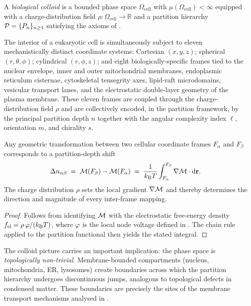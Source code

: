 \begin{definition}
\label{def:colloid}
A \emph{biological colloid} is a bounded phase space
$\Omega_\mathrm{cell}$ with $\mu(\Omega_\mathrm{cell}) < \infty$
equipped with a charge-distribution field
$\rho:\Omega_\mathrm{cell}\to\mathbb{R}$ and a partition hierarchy
$\mathcal{P} = \{P_n\}_{n\ge 1}$ satisfying the axioms of
.
\end{definition}

The interior of a eukaryotic cell is simultaneously subject to eleven
mechanistically distinct coordinate systems: Cartesian $(x,y,z)$; spherical
$(r,\theta,\phi)$; cylindrical $(r,\phi,z)$; and eight
biologically-specific frames tied to the nuclear envelope, inner and outer
mitochondrial membranes, endoplasmic reticulum cisternae, cytoskeletal tensegrity
axes, lipid-raft microdomains, vesicular transport lanes, and the electrostatic
double-layer geometry of the plasma membrane.  These eleven frames are coupled
through the charge-distribution field $\rho$ and are collectively encoded, in
the partition framework, by the principal partition depth $n$ together with the
angular complexity index $\ell$, orientation $m$, and chirality $s$.

\begin{proposition}
\label{prop:frame-coupling}
Any geometric transformation between two cellular coordinate frames $F_\alpha$
and $F_\beta$ corresponds to a partition-depth shift
\[
    \Delta n_{\alpha\beta}
    \;=\;
    \mathcal{M}(F_\beta) - \mathcal{M}(F_\alpha)
    \;=\;
    \frac{1}{k_{\mathrm{B}} T}\int_{F_\alpha}^{F_\beta} \nabla\mathcal{M} \cdot \mathrm{d}\mathbf{r}.
\]
The charge distribution $\rho$ sets the local gradient $\nabla\mathcal{M}$ and
thereby determines the direction and magnitude of every inter-frame mapping.
\end{proposition}

\begin{proof}
Follows from identifying $\mathcal{M}$ with the electrostatic free-energy density
$f_\mathrm{el} = \rho\,\varphi / (k_{\mathrm{B}} T)$, where $\varphi$ is the
local node voltage defined in .  The chain rule
applied to the partition functional then yields the stated integral.
\end{proof}

The colloid picture carries an important implication: the phase space is
\emph{topologically non-trivial}.  Membrane-bounded compartments (nucleus,
mitochondria, ER, lysosomes) create boundaries across which the partition
hierarchy undergoes discontinuous jumps, analogous to topological defects in
condensed matter.  These boundaries are precisely the sites of the membrane
transport mechanisms analysed in .

